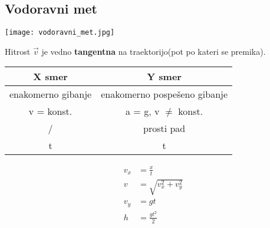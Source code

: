 {\color{indiagreen}\subsection{Vodoravni met}}
\begin{center}
	\texttt{[image: vodoravni\_met.jpg]}
\end{center}
Hitrost $\vec{v}$ je vedno \textbf{tangentna} na traektorijo(pot po kateri se premika).\\

\begin{center}
	\begin{tabular}{|c c|} 
 	\hline
 	X smer & Y smer \\
 	\hline
 	enakomerno gibanje & enakomerno pospešeno gibanje \\
 	v = konst. & a = g, v $\neq$ konst.\\
 	/ & prosti pad\\
 	t & t\\
 	\hline
 	\end{tabular}
\end{center}


\begin{align*}
	v_x &= \frac{x}{t}\\
	v &= \sqrt{v_x^2 + v_y^2}\\
	v_y &= gt\\
	h &= \frac{gt^2}{2}\\
\end{align*}